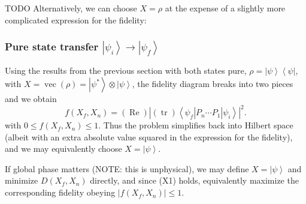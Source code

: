 \documentclass[aps, pra, a4paper, longbibliography]{revtex4}
\newcommand{\be}{\begin{equation}}
\newcommand{\ee}{\end{equation}}
\newcommand{\ket}[1]{\left| #1 \right \rangle}
\newcommand{\bra}[1]{\left \langle #1 \right|}
\newcommand{\ketbra}[2]{\left| #1 \right \rangle \left \langle #2 \right|}
\DeclareMathOperator{\tr}{tr}
\DeclareMathOperator{\re}{Re}
\DeclareMathOperator{\cvec}{vec}
\newcommand{\dd}[2]{\frac{\partial #1}{\partial #2}}
\begin{document}
TODO
Alternatively, we can choose $X = \rho$ at the expense of a slightly
more complicated expression for the fidelity:
\begin{comment}
\be
f(X_f, X_n)
= \frac{1}{P(X_f)} (\re) \tr(X_f^\dagger X_n)
= \frac{1}{P(X_f)} (\re) \tr(X_f^\dagger  P_n ... P_1 X_i P_1^\dagger ... P_n^\dagger)
\ee

\be
X_i := \left(\prod_{j=1}^{i} P_j\right) X_i \left(\prod_{j=1}^{i} P_j\right)^\dagger
\ee

\begin{align}
\dd{f(X_f, X_n)}{u(t_j)}
&= \re \left(\dd{g}{u(t_j)} \right)
= \frac{1}{P(X_f)} (\re) \tr \left(X_f \dd{X_n}{u(t_j)}\right)\\
&= \frac{1}{P(X_f)} \left(\tr \left(X_f P_n \cdots \dd{P_j}{u(t_j)} \cdots P_1 X_i P^\dagger_1 \cdots P^\dagger_n\right)
+\tr\left(X_f P_n \cdots P_1 X_i P^\dagger_1 \cdots \dd{P^\dagger(t_j)}{u(t_j)} \cdots P^\dagger_n\right)\right)\\
&= \frac{2}{P(X_f)} \re \tr\left(X_f P_n \cdots \dd{P_j}{u(t_j)} \cdots P_1 X_i P^\dagger_1 \cdots P^\dagger_n\right).
\end{align}
NOTE: last line not in paper!
\end{comment}



\subsubsection{Pure state transfer $\ket{\psi_i} \to \ket{\psi_f}$}
\label{sec:closed-pure}

Using the results from the previous section with both states pure,
$\rho = \ketbra{\psi}{\psi}$, with
$X = \cvec(\rho) = \ket{\psi^*} \otimes \ket{\psi}$,
the fidelity diagram breaks into two pieces and
we obtain
\be
f(X_f, X_n)
= (\re) \left|(\tr) \bra{\psi_f}  P_n \cdots P_1 \ket{\psi_i} \right|^2.
\ee
with $0 \le f(X_f, X_n) \le 1$.
Thus the problem simplifies back into Hilbert space
(albeit with an extra absolute value squared in the expression for the fidelity), and we may equivalently
choose $X = \ket{\psi}$.




If global phase matters (NOTE: this is unphysical), we may define $X = \ket{\psi}$ and minimize
$D(X_f, X_n)$ directly, and since (X1) holds,
equivalently maximize the corresponding fidelity
obeying
$|f(X_f, X_n)| \le 1$.
\end{document}
